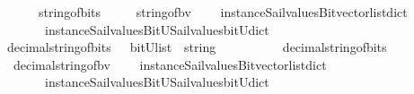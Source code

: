 \begin{isabellebody}
\ \ \ \ \ {\isachardoublequoteopen}\ string{\isacharunderscore}of{\isacharunderscore}bits\ {\isacharequal}\ {\isacharparenleft}\ \isanewline
\ \ string{\isacharunderscore}of{\isacharunderscore}bv\isanewline
\ \ \ \ {\isacharparenleft}instance{\isacharunderscore}Sail{}{\isacharunderscore}values{\isacharunderscore}Bitvector{\isacharunderscore}list{\isacharunderscore}dict\isanewline
\ \ \ \ \ \ \ instance{\isacharunderscore}Sail{}{\isacharunderscore}values{\isacharunderscore}BitU{\isacharunderscore}Sail{}{\isacharunderscore}values{\isacharunderscore}bitU{\isacharunderscore}dict{\isacharparenright}\ {\isacharparenright}{\isachardoublequoteclose}\isanewline
\isanewline
\isanewline
%
\isanewline
{}\isamarkupfalse%
\ decimal{\isacharunderscore}string{\isacharunderscore}of{\isacharunderscore}bits\ \ {\isacharcolon}{\isacharcolon}\ {\isachardoublequoteopen}{\isacharparenleft}bitU{\isacharparenright}list\ {\isasymRightarrow}\ string\ {\isachardoublequoteclose}\ \ \ \isanewline
\ \ \ \ \ {\isachardoublequoteopen}\ decimal{\isacharunderscore}string{\isacharunderscore}of{\isacharunderscore}bits\ {\isacharequal}\ {\isacharparenleft}\ \isanewline
\ \ decimal{\isacharunderscore}string{\isacharunderscore}of{\isacharunderscore}bv\isanewline
\ \ \ \ {\isacharparenleft}instance{\isacharunderscore}Sail{}{\isacharunderscore}values{\isacharunderscore}Bitvector{\isacharunderscore}list{\isacharunderscore}dict\isanewline
\ \ \ \ \ \ \ instance{\isacharunderscore}Sail{}{\isacharunderscore}values{\isacharunderscore}BitU{\isacharunderscore}Sail{}{\isacharunderscore}values{\isacharunderscore}bitU{\isacharunderscore}dict{\isacharparenright}\ {\isacharparenright}{\isachardoublequoteclose}\isanewline
\isanewline
\isanewline
%
\isanewline
%
\isanewline
%
\isanewline
%
\end{isabellebody}
